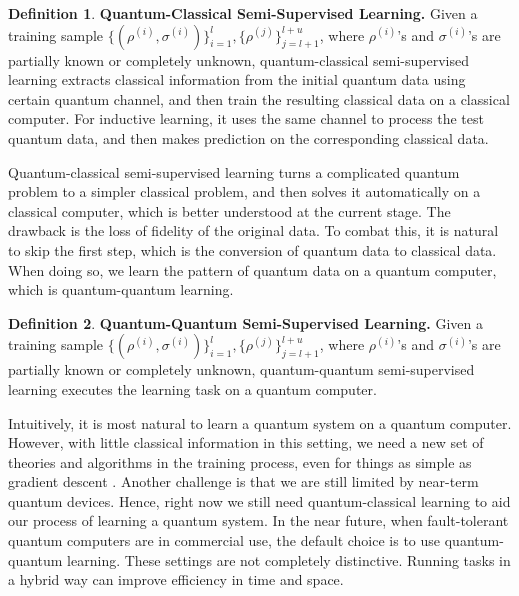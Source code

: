 \documentclass[11pt]{article}
\theoremstyle{definition}
\newtheorem{definition}{Definition}[section]
\def\rsi{\rho^{(i)}}
\def\rsj{\rho^{(j)}}
\def\csi{\sigma^{(i)}}
\begin{document}
\begin{definition}
\textbf{Quantum-Classical Semi-Supervised Learning.}
Given a training sample $\{ (\rsi, \csi) \}_{i = 1}^l, \{ \rsj \}_{j = l+1}^{l + u}$, where $\rsi$'s and $\csi$'s are partially known or completely unknown, quantum-classical semi-supervised learning extracts classical information from the initial quantum data using certain quantum channel, and then train the resulting classical data on a classical computer. For inductive learning, it uses the same channel to process the test quantum data, and then makes prediction on the corresponding classical data.
\end{definition}

Quantum-classical semi-supervised learning turns a complicated quantum problem to a simpler classical problem, and then solves it automatically on a classical computer, which is better understood at the current stage. 
The drawback is the loss of fidelity of the original data. To combat this, it is natural to skip the first step, which is the conversion of quantum data to classical data. When doing so, we learn the pattern of quantum data on a quantum computer, which is quantum-quantum learning.

\begin{definition}
\textbf{Quantum-Quantum Semi-Supervised Learning.}
Given a training sample $\{ (\rsi, \csi) \}_{i = 1}^l, \{ \rsj \}_{j = l+1}^{l + u}$, where $\rsi$'s and $\csi$'s are partially known or completely unknown, quantum-quantum semi-supervised learning executes the learning task on a quantum computer. 
\end{definition}

Intuitively, it is most natural to learn a quantum system on a quantum computer. However, with little classical information in this setting, we need a new set of theories and algorithms \cite{shangnan2019complexity, shangnan2021max, shangnan2021data} in the training process, even for things as simple as gradient descent \cite{shangnan2021qml}. Another challenge is that we are still limited by near-term quantum devices. Hence, right now we still need quantum-classical learning to aid our process of learning a quantum system.
In the near future, when fault-tolerant quantum computers are in commercial use, the default choice is to use quantum-quantum learning. 
These settings are not completely distinctive. Running tasks in a hybrid way can improve efficiency in time and space. 
\end{document}
